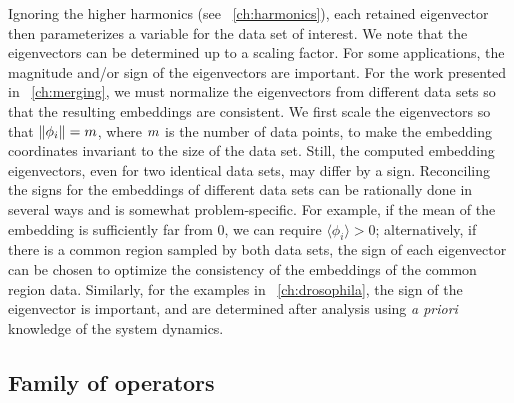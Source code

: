 Ignoring the higher harmonics (see \chap~\ref{ch:harmonics}), each retained eigenvector then parameterizes a variable for the data set of interest.
%
We note that the eigenvectors can be determined up to a scaling factor.
%
For some applications, the magnitude and/or sign of the eigenvectors are important. 
%
For the work presented in \chap~\ref{ch:merging}, we must normalize the eigenvectors from different data sets so that the resulting embeddings are consistent.
%
We first scale the eigenvectors so that $\|\phi_i\| = m$, where $m$ is the number of data points,
to make the embedding coordinates invariant to the size of the data set.
%
Still, the computed embedding eigenvectors, even for two identical data sets, may differ by a sign.
%
Reconciling the signs for the embeddings of different data sets can be rationally done in several ways and is somewhat problem-specific.
%
For example, if the mean of the embedding is sufficiently far from 0, we can require $\langle \phi_i \rangle > 0$;
alternatively, if there is a common region sampled by both data sets, the sign of each eigenvector can be chosen to optimize the consistency of the embeddings of the common region data.
%
%
Similarly, for the examples in \chap~\ref{ch:drosophila}, the sign of the eigenvector is important, and are determined after analysis using {\em a priori} knowledge of the system dynamics. 




\subsection{Family of operators} \label{sec:diff_limit}

